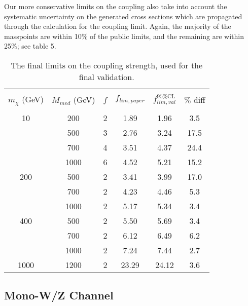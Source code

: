 \begin{flushleft}
\bigskip
Our more conservative limits on the coupling also take into account the systematic uncertainty on the generated cross sections which are propagated through the calculation for the coupling limit. Again, the majority of the masspoints are within 10\% of the public limits, and the remaining are within 25\%; see table 5.

\begin{table}
\begin{center}
\begin{tabular}{| c | c | c || c | c | c |}
\hline
&&&&& \\
$m_{\chi}$ (GeV) & $M_{med}$ (GeV) & $f$ & $f_{lim,paper}$ &  $f^{95\%\mathrm{CL}}_{lim,val}$ & $\%$ diff \\
&&&&& \\
\hline
\hline
10 & 200 & 2 & 1.89 & 1.96 & 3.5 \\
 & 500 & 3 & 2.76 & 3.24 & 17.5 \\
 & 700 & 4 & 3.51 & 4.37 & 24.4 \\
 & 1000 & 6 & 4.52 & 5.21 & 15.2 \\
200 & 500 & 2 & 3.41 & 3.99 & 17.0 \\
 & 700 & 2 & 4.23 & 4.46 & 5.3 \\
 & 1000 & 2 & 5.17 & 5.34 & 3.4 \\
400 & 500 & 2 & 5.50 & 5.69 & 3.4 \\
 & 700 & 2 & 6.12 & 6.49 & 6.2 \\
 & 1000 & 2 & 7.24 & 7.44 & 2.7 \\
1000 & 1200 & 2 & 23.29 & 24.12 & 3.6 \\
\hline
\end{tabular}
\end{center}
\caption{The final limits on the coupling strength, used for the final validation.}
\end{table}

\fi

\end{flushleft}

\subsection{Mono-W/Z Channel}
\label{monoWZ_validation}
\begin{flushleft}
\end{flushleft}
